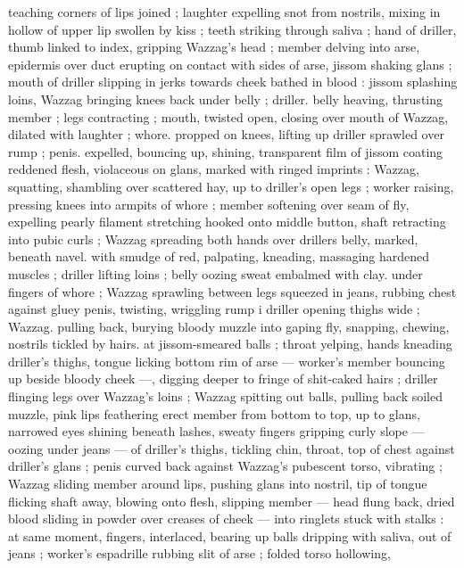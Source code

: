 teaching corners of lips joined ; laughter expelling snot from 
nostrils, mixing in hollow of upper lip swollen by kiss ; teeth striking 
through saliva ; hand of driller, thumb linked to index, gripping 
Wazzag's head ; member delving into arse, epidermis over duct 
erupting on contact with sides of arse, jissom shaking glans ; mouth 
of driller slipping in jerks towards cheek bathed in blood : jissom 
splashing loins, Wazzag bringing knees back under belly ; driller. 
belly heaving, thrusting member ; legs contracting ; mouth, twisted 
open, closing over mouth of Wazzag, dilated with laughter ; whore. 
propped on knees, lifting up driller sprawled over rump ; penis. 
expelled, bouncing up, shining, transparent film of jissom coating 
reddened flesh, violaceous on glans, marked with ringed imprints : 
Wazzag, squatting, shambling over scattered hay, up to driller's open 
legs ; worker raising, pressing knees into armpits of whore ; member 
softening over seam of fly, expelling pearly filament stretching 
hooked onto middle button, shaft retracting into pubic curls ; Wazzag 
spreading both hands over drillers belly, marked, beneath navel. 
with smudge of red, palpating, kneading, massaging hardened 
muscles ; driller lifting loins ; belly oozing sweat embalmed with clay. 
under fingers of whore ; Wazzag sprawling between legs squeezed 
in jeans, rubbing chest against gluey penis, twisting, wriggling rump 
i driller opening thighs wide ; Wazzag. pulling back, burying bloody 
muzzle into gaping fly, snapping, chewing, nostrils tickled by hairs. 
at jissom-smeared balls ; throat yelping, hands kneading driller's 
thighs, tongue licking bottom rim of arse --- worker's member 
bouncing up beside bloody cheek ---, digging deeper to fringe of 
shit-caked hairs ; driller flinging legs over Wazzag's loins ; Wazzag 
spitting out balls, pulling back soiled muzzle, pink lips feathering 
erect member from bottom to top, up to glans, narrowed eyes shining 
beneath lashes, sweaty fingers gripping curly slope --- oozing under 
jeans --- of driller's thighs, tickling chin, throat, top of chest against 
driller's glans ; penis curved back against Wazzag's pubescent torso, 
vibrating ; Wazzag sliding member around lips, pushing glans into 
nostril, tip of tongue flicking shaft away, blowing onto flesh, slipping 
member --- head flung back, dried blood sliding in powder over 
creases of cheek --- into ringlets stuck with stalks : at same moment, 
fingers, interlaced, bearing up balls dripping with saliva, out of jeans 
; worker's espadrille rubbing slit of arse ; folded torso hollowing, 
